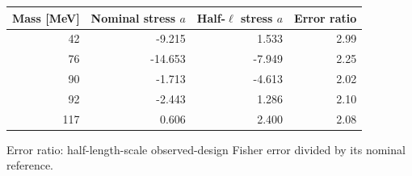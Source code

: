 \begin{center}\small
\begin{tabular}{rrrr}\toprule
Mass [MeV] & Nominal stress $a$ & Half-$\ell$ stress $a$ & Error ratio\\\midrule
42 & -9.215 & 1.533 & 2.99\\
76 & -14.653 & -7.949 & 2.25\\
90 & -1.713 & -4.613 & 2.02\\
92 & -2.443 & 1.286 & 2.10\\
117 & 0.606 & 2.400 & 2.08\\
\bottomrule\end{tabular}\end{center}
{\small Error ratio: half-length-scale observed-design Fisher error divided by its nominal reference.}

